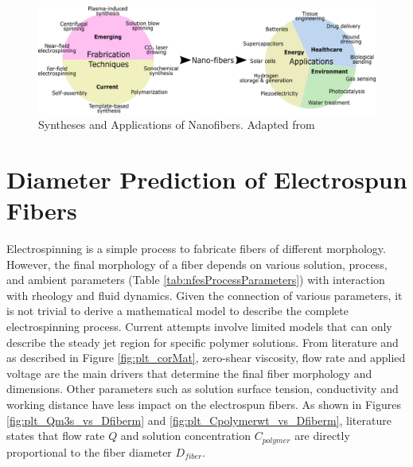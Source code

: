 \begin{figure}[!th]
\centering
\includegraphics[width=\textwidth]{./Figures/synthesesAndApplicationsOfNanofibers.png}
\decoRule
\caption[Syntheses and Applications of Nanofibers]{Syntheses and Applications of Nanofibers. Adapted from \cite{Kenry2017}}
\label{fig:synthesesAndApplicationsOfNanofibers}
\end{figure}

\section{Diameter Prediction of Electrospun Fibers} %

Electrospinning is a simple process to fabricate fibers of different morphology. However, the final morphology of a fiber depends on various solution, process, and ambient parameters (Table \ref{tab:nfesProcessParameters}) with interaction with rheology and fluid dynamics. Given the connection of various parameters, it is not trivial to derive a mathematical model to describe the complete electrospinning process. Current attempts involve limited models that can only describe the steady jet region for specific polymer solutions. \cite{Hohman2001a,Feng2002a,Reneker2000} From literature \cite{Greiner2008, Deitzel2001, Cui2007, Beachley2011} and as described in Figure \ref{fig:plt_corMat}, zero-shear viscosity, flow rate and applied voltage are the main drivers that determine the final fiber morphology and dimensions. Other parameters such as solution surface tension, conductivity and working distance have less impact on the electrospun fibers. \cite{Ramakrishna2005} As shown in Figures \ref{fig:plt_Qm3s_vs_Dfiberm} and \ref{fig:plt_Cpolymerwt_vs_Dfiberm}, literature states that flow rate $Q$ and solution concentration $C_{polymer}$ are directly proportional to the fiber diameter $D_{fiber}$. \cite{Wang2008, McKee2004, Gupta2005}

